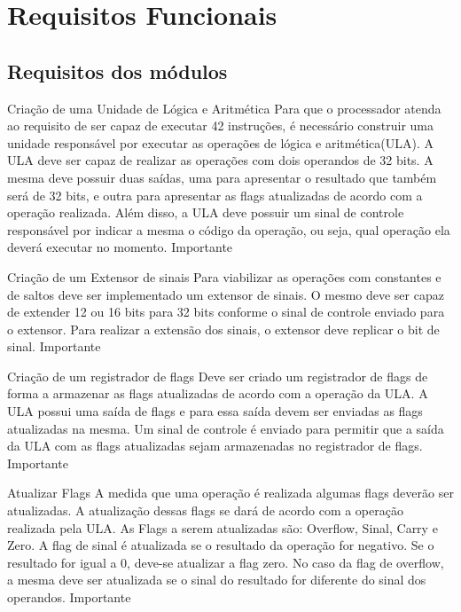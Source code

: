 \documentclass{report}
\begin{document}
  \section{Requisitos Funcionais}
    \subsection{Requisitos dos módulos}
    \begin{functional}
      \requirement
      {Criação de uma Unidade de Lógica e Aritmética}
      {Para que o processador atenda ao requisito de ser capaz de executar 42 instruções, é necessário construir uma unidade responsável por executar as operações de lógica e aritmética(ULA). A ULA deve ser capaz de realizar as operações com dois operandos de 32 bits. A mesma deve possuir duas saídas, uma para apresentar o resultado que também será de 32 bits, e outra para apresentar as flags atualizadas de acordo com a operação realizada. Além disso, a ULA deve possuir um sinal de controle responsável por indicar a mesma o código da operação, ou seja, qual operação ela deverá executar no momento.}
      {Importante}
      
       \requirement
      {Criação de um Extensor de sinais}
      {Para viabilizar as operações com constantes e de saltos deve ser implementado um extensor de sinais. O mesmo deve ser capaz de extender 12 ou 16 bits para 32 bits conforme o sinal de controle enviado para o extensor. Para realizar a extensão dos sinais, o extensor deve replicar o bit de sinal.}
      {Importante}
      
       \requirement
      {Criação de um registrador de flags}
      {Deve ser criado um registrador de flags de forma a armazenar as flags atualizadas de acordo com a operação da ULA. A ULA possui uma saída de flags e para essa saída devem  ser enviadas as flags atualizadas na mesma. Um sinal de controle é enviado para permitir que a saída da ULA com as flags atualizadas sejam armazenadas no registrador de flags.}
      {Importante}
      
    \requirement
      {Atualizar Flags}
      {A medida que uma operação é realizada algumas flags deverão ser atualizadas. A atualização dessas flags se dará de acordo com a operação realizada pela ULA. As Flags a serem atualizadas são: Overflow, Sinal, Carry e Zero. A flag de sinal é atualizada se o resultado da operação for negativo. Se o resultado for igual a 0, deve-se atualizar a flag zero. No caso da flag de overflow, a mesma deve ser atualizada se o sinal do resultado for diferente do sinal dos operandos.   }
      {Importante}
   

\end{functional}
\end{document}
